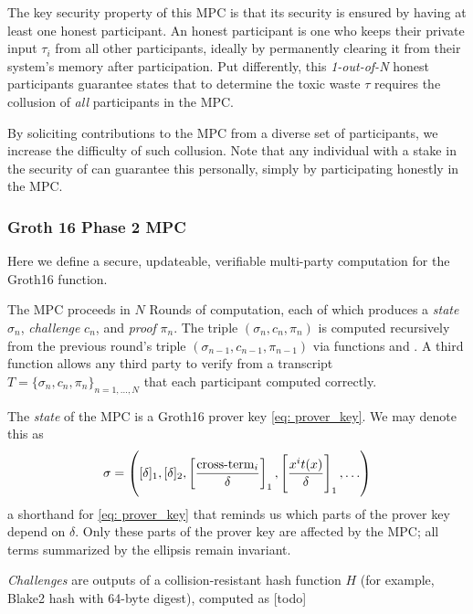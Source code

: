The key security property of this MPC is that its security is ensured by having at least one honest participant. An honest participant is one who keeps their private input $\tau_i$ from all other participants, ideally by permanently clearing it from their system's memory after participation. Put differently, this \emph{1-out-of-N} honest participants guarantee states that to determine the toxic waste $\tau$ requires the collusion of \emph{all} participants in the MPC. 

By soliciting contributions to the MPC from a diverse set of participants, we increase the difficulty of such collusion. Note that any individual with a stake in the security of \MantaPay{} can guarantee this personally, simply by participating honestly in the \Setup{} MPC.

\subsubsection{Groth 16 Phase 2 MPC}\label{sec: mpc_def}
Here we define a secure, updateable, verifiable multi-party computation for the Groth16 \Setup{} function. 

The MPC proceeds in $N$ Rounds of computation, each of which produces a \emph{state} $\sigma_n$, \emph{challenge} $c_n$, and \emph{proof} $\pi_n$. The triple $(\sigma_n, c_n, \pi_n)$ is computed recursively from the previous round's triple $(\sigma_{n-1}, c_{n-1}, \pi_{n-1})$ via functions \contribute{} and \challenge{}. A third function \verify{} allows any third party to verify from a transcript $T = \{ \sigma_n, c_n, \pi_n \}_{n=1,\ldots, N}$ that each participant computed \contribute{} correctly. 

\begin{definition}[State]
    The \emph{state} of the MPC is a Groth16 prover key \eqref{eq: prover_key}. We may denote this as 
    \begin{equation}\label{eq: short sigma} \sigma = \left( [\delta]_1, [\delta]_2, \left[\frac{\text{cross-term}_i }{\delta}\right]_1, \left[ \frac{x^i t(x)}{\delta} \right]_1{}{}, \ldots \right) \end{equation} 
    a shorthand for \eqref{eq: prover_key} that reminds us which parts of the prover key depend on $\delta$. Only these parts of the prover key are affected by the MPC; all terms summarized by the ellipsis remain invariant.
\end{definition}

\begin{definition}[Challenge]
    \emph{Challenges} are outputs of a collision-resistant hash function $H$ (for example, Blake2 hash with 64-byte digest), computed as [todo]  %
\end{definition}

